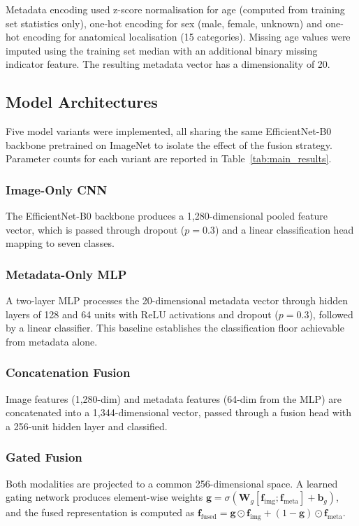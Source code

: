 \documentclass[conference]{IEEEtran}
\begin{document}
Metadata encoding used z-score normalisation for age (computed from training set statistics only), one-hot encoding for sex (male, female, unknown) and one-hot encoding for anatomical localisation (15 categories). Missing age values were imputed using the training set median with an additional binary missing indicator feature. The resulting metadata vector has a dimensionality of 20.

\subsection{Model Architectures}

Five model variants were implemented, all sharing the same EfficientNet-B0 backbone \citep{tan2019efficientnet} pretrained on ImageNet to isolate the effect of the fusion strategy. Parameter counts for each variant are reported in Table~\ref{tab:main_results}.

\subsubsection{Image-Only CNN}
The EfficientNet-B0 backbone produces a 1,280-dimensional pooled feature vector, which is passed through dropout ($p=0.3$) and a linear classification head mapping to seven classes.

\subsubsection{Metadata-Only MLP}
A two-layer MLP processes the 20-dimensional metadata vector through hidden layers of 128 and 64 units with ReLU activations and dropout ($p=0.3$), followed by a linear classifier. This baseline establishes the classification floor achievable from metadata alone.

\subsubsection{Concatenation Fusion}
Image features (1,280-dim) and metadata features (64-dim from the MLP) are concatenated into a 1,344-dimensional vector, passed through a fusion head with a 256-unit hidden layer and classified.

\subsubsection{Gated Fusion}
Both modalities are projected to a common 256-dimensional space. A learned gating network produces element-wise weights $\mathbf{g} = \sigma(\mathbf{W}_g[\mathbf{f}_{\text{img}}; \mathbf{f}_{\text{meta}}] + \mathbf{b}_g)$, and the fused representation is computed as $\mathbf{f}_{\text{fused}} = \mathbf{g} \odot \mathbf{f}_{\text{img}} + (1 - \mathbf{g}) \odot \mathbf{f}_{\text{meta}}$.
\end{document}
